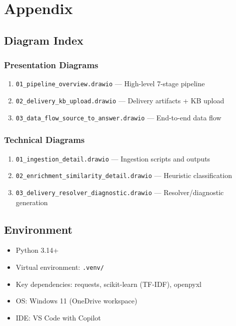\documentclass[12pt,a4paper]{report}
\begin{document}
\chapter{Appendix}

\section{Diagram Index}

\subsection{Presentation Diagrams}
\begin{enumerate}
  \item \texttt{01\_pipeline\_overview.drawio} --- High-level 7-stage pipeline
  \item \texttt{02\_delivery\_kb\_upload.drawio} --- Delivery artifacts + KB upload
  \item \texttt{03\_data\_flow\_source\_to\_answer.drawio} --- End-to-end data flow
\end{enumerate}

\subsection{Technical Diagrams}
\begin{enumerate}
  \item \texttt{01\_ingestion\_detail.drawio} --- Ingestion scripts and outputs
  \item \texttt{02\_enrichment\_similarity\_detail.drawio} --- Heuristic classification
  \item \texttt{03\_delivery\_resolver\_diagnostic.drawio} --- Resolver/diagnostic generation
\end{enumerate}

\section{Environment}

\begin{itemize}
  \item Python 3.14+
  \item Virtual environment: \texttt{.venv/}
  \item Key dependencies: requests, scikit-learn (TF-IDF), openpyxl
  \item OS: Windows 11 (OneDrive workspace)
  \item IDE: VS Code with Copilot
\end{itemize}
\end{document}
